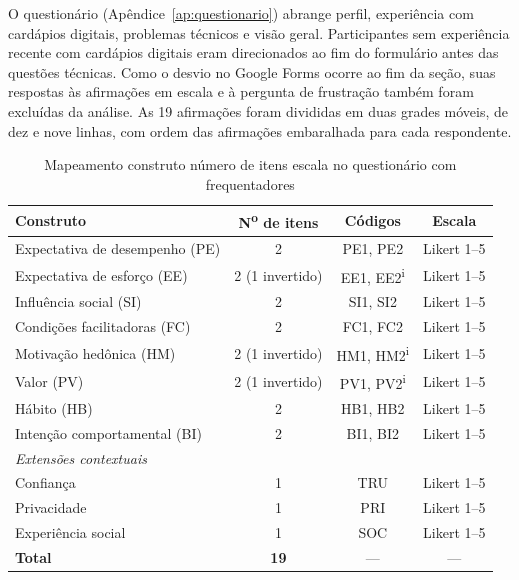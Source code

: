 O questionário (Apêndice~\ref{ap:questionario}) abrange perfil, experiência com cardápios digitais, problemas técnicos e visão geral. Participantes sem experiência recente com cardápios digitais eram direcionados ao fim do formulário antes das questões técnicas. Como o desvio no Google Forms ocorre ao fim da seção, suas respostas às afirmações em escala e à pergunta de frustração também foram excluídas da análise. As 19 afirmações foram divididas em duas grades móveis, de dez e nove linhas, com ordem das afirmações embaralhada para cada respondente.

\begin{table}[!ht]
    \caption{Mapeamento construto \texttimes{} número de itens \texttimes{} escala no questionário com frequentadores}
    \label{tab:utaut2-mapeamento}
    \centering%
    \begin{minipage}{.98\textwidth}
        \renewcommand{\arraystretch}{1.2}
        \begin{tabular*}{\textwidth}{l@{\extracolsep{\fill}}ccc}
            \toprule
            \textbf{Construto} & \textbf{N\textsuperscript{o} de itens} & \textbf{Códigos} & \textbf{Escala} \\
            \midrule
            Expectativa de desempenho (PE) & 2 & PE1, PE2 & Likert 1--5 \\
            Expectativa de esforço (EE) & 2 (1 invertido) & EE1, EE2\textsuperscript{i} & Likert 1--5 \\
            Influência social (SI) & 2 & SI1, SI2 & Likert 1--5 \\
            Condições facilitadoras (FC) & 2 & FC1, FC2 & Likert 1--5 \\
            Motivação hedônica (HM) & 2 (1 invertido) & HM1, HM2\textsuperscript{i} & Likert 1--5 \\
            Valor (PV) & 2 (1 invertido) & PV1, PV2\textsuperscript{i} & Likert 1--5 \\
            Hábito (HB) & 2 & HB1, HB2 & Likert 1--5 \\
            Intenção comportamental (BI) & 2 & BI1, BI2 & Likert 1--5 \\
            \midrule
            \multicolumn{4}{l}{\textit{Extensões contextuais}} \\
            Confiança & 1 & TRU & Likert 1--5 \\
            Privacidade & 1 & PRI & Likert 1--5 \\
            Experiência social & 1 & SOC & Likert 1--5 \\
            \midrule
            \textbf{Total} & \textbf{19} & --- & --- \\
            \bottomrule
        \end{tabular*}
    \end{minipage}
\end{table}

